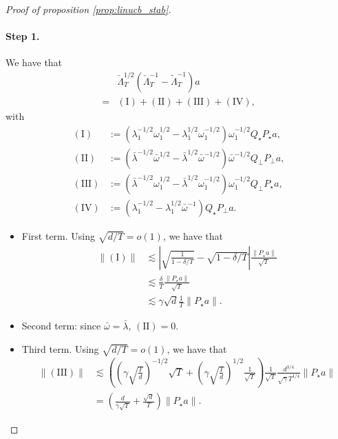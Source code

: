 \documentclass[11pt]{article}
\begin{document}
\begin{proof}[Proof of proposition \ref{prop:linucb_stab}]
\paragraph{Step 1.} We have that
\begin{align*}
    & \check \Lambda_T^{1/2} \left( \check \Lambda_T^{-1} - \widetilde\Lambda_T^{-1} \right) a \\
    =& (\mathrm{I}) + (\mathrm{II}) + (\mathrm{III}) + (\mathrm{IV}),
\end{align*}
with 
\begin{align*}
    (\mathrm{I}) &:= \left(\lambda_1^{-1/2} \omega_1^{1/2} - \lambda_1^{1/2} \omega_1^{-1/2} \right) \omega_1^{-1/2} Q_\star P_\star a,\\
    (\mathrm{II}) &:= \left( \bar \lambda^{-1/2}  \bar \omega^{1/2} - \bar \lambda^{1/2} \bar \omega^{-1/2} \right) \bar \omega^{-1/2} Q_\perp P_\perp a,\\
    (\mathrm{III}) &:= \left( \bar \lambda^{-1/2} \omega_1^{1/2} - \bar \lambda^{1/2} \omega_1^{-1/2} \right) \omega_1^{-1/2} Q_{\perp} P_\star a, \\
    (\mathrm{IV}) &:= \left(\lambda_1^{-1/2} - \lambda_1^{1/2} \bar \omega^{-1} \right) Q_\star P_\perp a.
\end{align*}
\begin{itemize}
    \item First term. Using $\sqrt{d / T} = o(1)$, we have that
\begin{align*}
    \|(\mathrm{I})\| &\lesssim \left\lvert \sqrt{\frac{1}{1 - \delta / T}} - \sqrt{1 - \delta / T} \right\rvert \frac{\|P_\star a \|}{\sqrt{T}}   \\
    & \lesssim \frac{\delta}{T} \frac{\|P_\star a \|}{\sqrt{T}}  \\ 
    & \lesssim \gamma \sqrt{d} \frac{1}{T} \| P_\star a \|.
\end{align*}
\item Second term: since $\bar \omega = \bar \lambda$, $\mathrm{(II)} = 0$.
\item Third term. Using $\sqrt{d / T} = o(1)$, we have that
\begin{align*}
    \|(\mathrm{III})\| &\lesssim \left( \left( \gamma \sqrt{\frac{T}{d }} \right)^{-1/2} \sqrt{T} + \left( \gamma \sqrt{\frac{T}{d }} \right)^{1/2} \frac{1}{\sqrt{T}} \right) \frac{1}{\sqrt{T}} \frac{d^{3/4}}{\sqrt{\gamma} T^{1/4}} \|P_\star a\| \\
    &= \left(\frac{d}{\gamma \sqrt{T}} + \frac{\sqrt{d}}{T} \right) \|P_\star a\|.
\end{align*} 

\end{itemize}
\end{proof}
\end{document}
